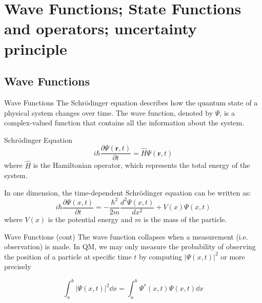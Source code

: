 
\section[Wave Functions]{Wave Functions; State Functions and operators; uncertainty principle}
\subsection{Wave Functions}

\begin{frame}{Wave Functions}
The Schrödinger equation describes how the quantum state of a physical system changes over time. The wave function, denoted by $\Psi$, is a complex-valued function that contains all the information about the system.

\begin{block}{Schrödinger Equation}
    \begin{equation*}
        i\hbar \frac{\partial \Psi(\mathbf{r}, t)}{\partial t} = \hat{H} \Psi(\mathbf{r}, t)
    \end{equation*}
    where $\hat{H}$ is the Hamiltonian operator, which represents the total energy of the system.

    In one dimension, the time-dependent Schrödinger equation can be written as:
    \begin{equation*}
        i\hbar \frac{\partial \Psi(x, t)}{\partial t} = -\frac{\hbar^2}{2m} \frac{d^2 \Psi(x, t)}{dx^2} + V(x) \Psi(x, t)
    \end{equation*}
    where $V(x)$ is the potential energy and $m$ is the mass of the particle.

\end{block}

\end{frame}

\begin{frame}{Wave Functions (cont)}
The wave function collapses when a measurement (i.e. observation) is made.
In QM, we may only measure the probability of observing the position of a particle at specific time $t$ by computing $|\Psi(x,t)|^2$ or more precisely
\begin{block}

    \[
        \int_a^b |\Psi(x,t)|^2 \dd{x} = \int_a^b \Psi^*(x,t) \Psi(x,t) \dd{x}
    \]

\end{block}
\end{frame}

